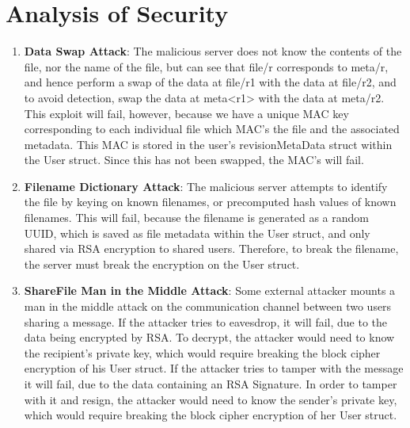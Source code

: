\documentclass[11pt]{article}
\begin{document}
\section{Analysis of Security}
\begin{enumerate}
\item
\textbf{Data Swap Attack}: The malicious server does not know the contents of the file, nor the name of the file,
but can see that file/r corresponds to meta/r, and hence perform a swap of the data at file/r1 with the data at file/r2, and to avoid detection, swap the data at meta<r1> with the data at meta/r2. This exploit will fail, however, because we have a unique MAC key corresponding to each individual file which MAC's the file and the associated metadata. This MAC is stored in the
user's revisionMetaData struct within the User struct. Since this has not been swapped, the MAC's will fail.

\item
\textbf{Filename Dictionary Attack}: The malicious server attempts to identify the file by keying on known filenames, or precomputed hash values of known filenames. This will fail, because the filename is generated as a random UUID, which is saved as file metadata within the User struct, and only shared via RSA encryption to shared users. Therefore, to break the filename, the server must break the encryption on the User struct.

\item
\textbf{ShareFile Man in the Middle Attack}: Some external attacker mounts a man in the middle attack on the communication channel between two users sharing a message. If the attacker tries to eavesdrop, it will fail, due to the data being encrypted by RSA. To decrypt, the attacker would need to know the recipient's private key, which would require breaking the block cipher encryption of his User struct. If the attacker tries to tamper with the message it will fail, due to the data containing an RSA Signature. In order to tamper with it and resign, the attacker would need to know the sender's private key, which would require breaking the block cipher encryption of her User struct.

\end{enumerate}
\end{document}
